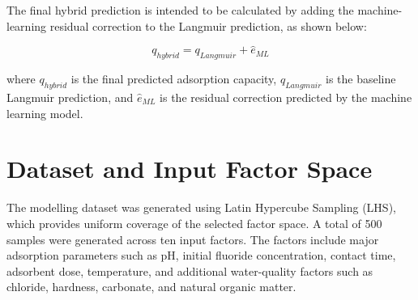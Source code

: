 \begin{table}[H]
	\centering
	\caption{Hybrid modelling workflow followed in the project}
	\label{tab:hybrid_workflow}
	\renewcommand{\arraystretch}{1.25}
\end{table}

The final hybrid prediction is intended to be calculated by adding the machine-learning residual correction to the Langmuir prediction, as shown below:

\begin{equation}
	q_{hybrid} = q_{Langmuir} + \hat{e}_{ML}
	\label{eq:hybrid_model}
\end{equation}

where $q_{hybrid}$ is the final predicted adsorption capacity, $q_{Langmuir}$ is the baseline Langmuir prediction, and $\hat{e}_{ML}$ is the residual correction predicted by the machine learning model.

\section{Dataset and Input Factor Space}

The modelling dataset was generated using Latin Hypercube Sampling (LHS), which provides uniform coverage of the selected factor space. A total of 500 samples were generated across ten input factors. The factors include major adsorption parameters such as pH, initial fluoride concentration, contact time, adsorbent dose, temperature, and additional water-quality factors such as chloride, hardness, carbonate, and natural organic matter.

